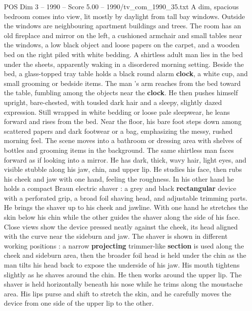 \begin{textsample}{POS Dim 3 – 1990 – Score 5.00 – 1990/tv\_com\_1990\_35.txt}  \label{ex:f3_pos_059}
A dim, spacious bedroom comes into view, lit mostly by daylight from tall bay windows.
Outside the windows are neighbouring apartment buildings and trees.
The room has an old fireplace and mirror on the left, a cushioned armchair and small tables near the windows, a low black object and loose papers on the carpet, and a wooden bed on the right piled with white bedding.
A shirtless adult man lies in the bed under the sheets, apparently waking in a disordered morning setting.
Beside the bed, a glass-topped tray table holds a black round alarm \textbf{clock}, a white cup, and small grooming or bedside items.
The man ’s arm reaches from the bed toward the table, fumbling among the objects near the \textbf{clock}.
He then pushes himself upright, bare-chested, with tousled dark hair and a sleepy, slightly dazed expression.
Still wrapped in white bedding or loose pale sleepwear, he leans forward and rises from the bed.
Near the floor, his bare foot steps down among scattered papers and dark footwear or a bag, emphasizing the messy, rushed morning feel.
The scene moves into a bathroom or dressing area with shelves of bottles and grooming items in the background.
The same shirtless man faces forward as if looking into a mirror.
He has dark, thick, wavy hair, light eyes, and visible stubble along his jaw, chin, and upper lip.
He studies his face, then rubs his cheek and jaw with one hand, feeling the roughness.
In his other hand he holds a compact Braun electric shaver : a grey and black \textbf{rectangular} device with a perforated grip, a broad foil shaving head, and adjustable trimming parts.
He brings the shaver up to his cheek and jawline.
With one hand he stretches the skin below his chin while the other guides the shaver along the side of his face.
Close views show the device pressed neatly against the cheek, its head aligned with the curve near the sideburn and jaw.
The shaver is shown in different working positions : a narrow \textbf{projecting} trimmer-like \textbf{section} is used along the cheek and sideburn area, then the broader foil head is held under the chin as the man tilts his head back to expose the underside of his jaw.
His mouth tightens slightly as he shaves around the chin.
He then works around the upper lip.
The shaver is held horizontally beneath his nose while he trims along the moustache area.
His lips purse and shift to stretch the skin, and he carefully moves the device from one side of the upper lip to the other.

\end{textsample}
